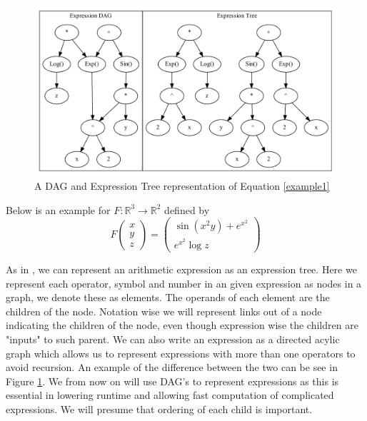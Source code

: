 \documentclass{article}
\begin{document}
\begin{figure}[h]
    \includegraphics[width=16cm]{images/Clustergraph.gv.pdf}
    \caption{A DAG and Expression Tree representation of Equation \ref{example1}}
    \label{fig:DAGgraph2}
\end{figure}

Below is an example for $F: \mathbb{R}^3 \rightarrow \mathbb{R}^2$ defined by
\begin{equation} \label{example1}
    F \begin{pmatrix}
        x \\ y \\ z
    \end{pmatrix} = \begin{pmatrix}
        \sin (x^2 y) + e^{x^2} \\ e^{x^2} \log z
    \end{pmatrix}
\end{equation}

As in \cite{PoPBook}, we can represent an arithmetic expression as an expression tree. Here we represent each operator, symbol and number in an given expression as nodes in a graph, we denote these as elements. The operands of each element are the children of the node. Notation wise we will represent links out of a node indicating the children of the node, even though expression wise the children are "inputs" to such parent. We can also write an expression as a directed acylic graph which allows us to represent expressions with more than one operators to avoid recursion. An example of the difference between the two can be see in Figure \ref{fig:DAGgraph2}. We from now on will use DAG's to represent expressions as this is essential in lowering runtime and allowing fast computation of complicated expressions. We will presume that ordering of each child is important.
\end{document}
